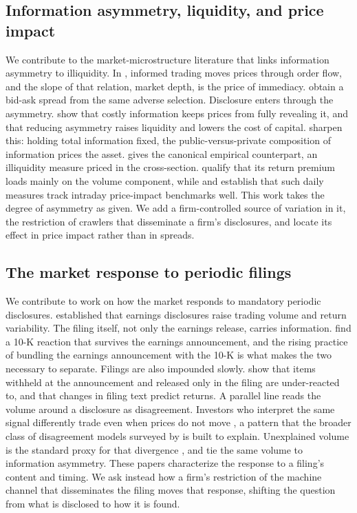 \documentclass[12pt]{article}
\begin{document}
\subsection{Information asymmetry, liquidity, and price impact}
We contribute to the market-microstructure literature that links information asymmetry to illiquidity. In \citet{Kyle1985}, informed trading moves prices through order flow, and the slope of that relation, market depth, is the price of immediacy. \citet{GlostenMilgrom1985} obtain a bid-ask spread from the same adverse selection. Disclosure enters through the asymmetry. \citet{GrossmanStiglitz1980} show that costly information keeps prices from fully revealing it, and \citet{DiamondVerrecchia1991} that reducing asymmetry raises liquidity and lowers the cost of capital. \citet{EasleyOHara2004} sharpen this: holding total information fixed, the public-versus-private composition of information prices the asset. \citet{Amihud2002} gives the canonical empirical counterpart, an illiquidity measure priced in the cross-section. \citet{LouShu2017} qualify that its return premium loads mainly on the volume component, while \citet{GoyenkoHoldenTrzcinka2009} and \citet{Hasbrouck2009} establish that such daily measures track intraday price-impact benchmarks well. This work takes the degree of asymmetry as given. We add a firm-controlled source of variation in it, the restriction of crawlers that disseminate a firm's disclosures, and locate its effect in price impact rather than in spreads.

\subsection{The market response to periodic filings}
We contribute to work on how the market responds to mandatory periodic disclosures. \citet{Beaver1968} established that earnings disclosures raise trading volume and return variability. The filing itself, not only the earnings release, carries information. \citet{LiRamesh2009} find a 10-K reaction that survives the earnings announcement, and the rising practice of bundling the earnings announcement with the 10-K \citep{ArifMarshallSchroederYohn2019} is what makes the two necessary to separate. Filings are also impounded slowly. \citet{LiNekrasovTeoh2020} show that items withheld at the announcement and released only in the filing are under-reacted to, and \citet{CohenMalloyNguyen2020} that changes in filing text predict returns. A parallel line reads the volume around a disclosure as disagreement. Investors who interpret the same signal differently trade even when prices do not move \citep{KandelPearson1995}, a pattern that the broader class of disagreement models surveyed by \citet{HongStein2007} is built to explain. Unexplained volume is the standard proxy for that divergence \citep{GarfinkelSokobin2006,Garfinkel2009}, and \citet{KimVerrecchia1994} tie the same volume to information asymmetry. These papers characterize the response to a filing's content and timing. We ask instead how a firm's restriction of the machine channel that disseminates the filing moves that response, shifting the question from what is disclosed to how it is found.
\end{document}
